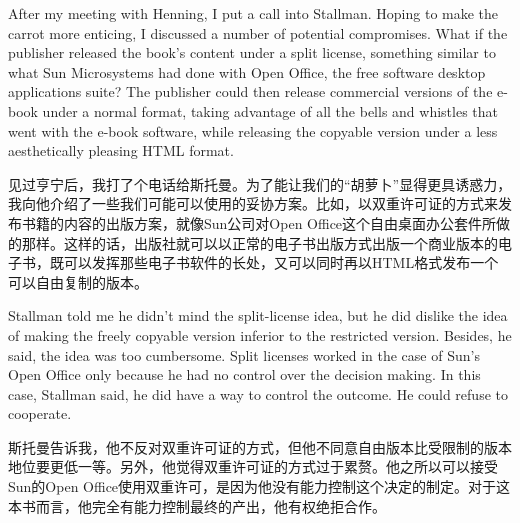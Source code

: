 \ifdefined\eng
After my meeting with Henning, I put a call into Stallman. Hoping to make the carrot more enticing, I discussed a number of potential compromises. What if the publisher released the book's content under a split license, something similar to what Sun Microsystems had done with Open Office, the free software desktop applications suite? The publisher could then release commercial %
versions of the e-book under a normal %
format, taking advantage of all the bells and whistles that went with the e-book software, while releasing the copyable version under a less aesthetically pleasing HTML format.
\fi

\ifdefined\chs
见过亨宁后，我打了个电话给斯托曼。为了能让我们的``胡萝卜''显得更具诱惑力，我向他介绍了一些我们可能可以使用的妥协方案。比如，以双重许可证的方式来发布书籍的内容的出版方案，就像Sun公司对Open Office这个自由桌面办公套件所做的那样。这样的话，出版社就可以以正常的电子书出版方式出版一个商业版本的电子书，既可以发挥那些电子书软件的长处，又可以同时再以HTML格式发布一个可以自由复制的版本。
\fi

\ifdefined\eng
Stallman told me he didn't mind the split-license idea, but he did dislike the idea of making the freely copyable version inferior to the restricted version. Besides, he said, the idea was too cumbersome. Split licenses worked in the case of Sun's Open Office only because he had no control over the decision making. In this case, Stallman said, he did have a way to control the outcome. He could refuse to cooperate.
\fi

\ifdefined\chs
斯托曼告诉我，他不反对双重许可证的方式，但他不同意自由版本比受限制的版本地位要更低一等。另外，他觉得双重许可证的方式过于累赘。他之所以可以接受Sun的Open Office使用双重许可，是因为他没有能力控制这个决定的制定。对于这本书而言，他完全有能力控制最终的产出，他有权绝拒合作。
\fi


